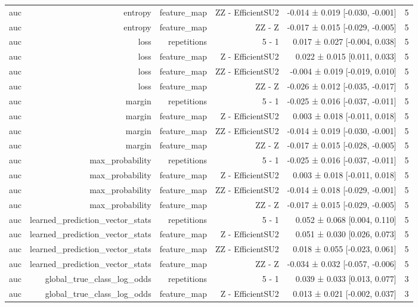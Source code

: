 \begin{table}
\begin{tabular}{lrrrrr}
auc & entropy & feature\_map & ZZ - EfficientSU2 & -0.014 ± 0.019 [-0.030, -0.001] & 5 \\
auc & entropy & feature\_map & ZZ - Z & -0.017 ± 0.015 [-0.029, -0.005] & 5 \\
auc & loss & repetitions & 5 - 1 & 0.017 ± 0.027 [-0.004, 0.038] & 5 \\
auc & loss & feature\_map & Z - EfficientSU2 & 0.022 ± 0.015 [0.011, 0.033] & 5 \\
auc & loss & feature\_map & ZZ - EfficientSU2 & -0.004 ± 0.019 [-0.019, 0.010] & 5 \\
auc & loss & feature\_map & ZZ - Z & -0.026 ± 0.012 [-0.035, -0.017] & 5 \\
auc & margin & repetitions & 5 - 1 & -0.025 ± 0.016 [-0.037, -0.011] & 5 \\
auc & margin & feature\_map & Z - EfficientSU2 & 0.003 ± 0.018 [-0.011, 0.018] & 5 \\
auc & margin & feature\_map & ZZ - EfficientSU2 & -0.014 ± 0.019 [-0.030, -0.001] & 5 \\
auc & margin & feature\_map & ZZ - Z & -0.017 ± 0.015 [-0.028, -0.005] & 5 \\
auc & max\_probability & repetitions & 5 - 1 & -0.025 ± 0.016 [-0.037, -0.011] & 5 \\
auc & max\_probability & feature\_map & Z - EfficientSU2 & 0.003 ± 0.018 [-0.011, 0.018] & 5 \\
auc & max\_probability & feature\_map & ZZ - EfficientSU2 & -0.014 ± 0.018 [-0.029, -0.001] & 5 \\
auc & max\_probability & feature\_map & ZZ - Z & -0.017 ± 0.015 [-0.029, -0.005] & 5 \\
auc & learned\_prediction\_vector\_stats & repetitions & 5 - 1 & 0.052 ± 0.068 [0.004, 0.110] & 5 \\
auc & learned\_prediction\_vector\_stats & feature\_map & Z - EfficientSU2 & 0.051 ± 0.030 [0.026, 0.073] & 5 \\
auc & learned\_prediction\_vector\_stats & feature\_map & ZZ - EfficientSU2 & 0.018 ± 0.055 [-0.023, 0.061] & 5 \\
auc & learned\_prediction\_vector\_stats & feature\_map & ZZ - Z & -0.034 ± 0.032 [-0.057, -0.006] & 5 \\
auc & global\_true\_class\_log\_odds & repetitions & 5 - 1 & 0.039 ± 0.033 [0.013, 0.077] & 3 \\
auc & global\_true\_class\_log\_odds & feature\_map & Z - EfficientSU2 & 0.013 ± 0.021 [-0.002, 0.037] & 3 \\

\end{tabular}
\end{table}
